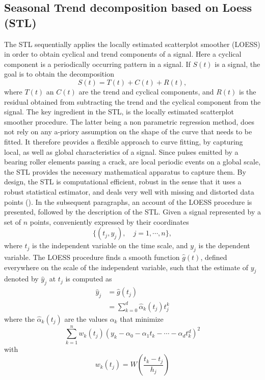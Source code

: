 \documentclass[../Main/thesis.tex]{subfiles}
\begin{document}
\subsection{Seasonal Trend decomposition based on Loess (STL)}
The STL sequentially applies the locally estimated scatterplot smoother (LOESS) in order to obtain cyclical and trend components of a signal. Here a cyclical component is a periodically occurring pattern in a signal.
If $S(t)$ is a signal, the goal is to obtain the decomposition 
\begin{equation}
S(t) = T(t) + C(t) + R(t),
\end{equation} 
where $T(t)$ an $C(t)$ are the trend and cyclical components, and $R(t)$ is the residual obtained from subtracting  the trend and the cyclical component from the signal. The key ingredient in the STL, is the locally estimated scatterplot smoother procedure. The latter being a non parametric regression method, does not rely on any a-priory assumption on the shape of the curve that needs to be fitted. It therefore provides a flexible approach to curve fitting, by capturing local, as well as global characteristics of a signal. Since pulses emitted by a bearing roller elements passing a crack, are local periodic events on a global scale, the STL provides the necessary mathematical apparatus to capture them.
\justify
By design, the STL is computational efficient, robust in the sense that it uses a robust statistical estimator, and deals very well with missing and distorted data points (\cite{Cleveland-et-al-1990}). In the subsequent paragraphs, an account of the LOESS procedure is presented, followed by the description of the STL.
\justify
Given a signal represented by a set of $n$ points, conveniently expressed by their coordinates
\begin{equation}
\{ (t_{j}, y_{j}), \quad j = 1, \cdots, n\},
\end{equation}
where $t_{j}$ is the independent variable on the time scale, and $y_{j}$ is the dependent variable. The LOESS procedure finds a smooth function $\hat{g}(t)$, defined everywhere on the scale of the independent variable, such that the estimate of $y_{j}$ denoted by $\hat{y}_{j}$ at $t_{j}$ is computed as 
\begin{equation}
\begin{split}
\hat{y}_{j} &= \hat{g}(t_{j}) \\
                &=\sum_{k=0}^{d}\hat{\alpha}_{k}(t_{j})t_{j}^{k}
\end{split}
\end{equation}
where the $\hat{\alpha}_{k}(t_{j})$ are the values $\alpha_{k}$ that minimize 
\begin{equation}
\sum_{k=1}^{n}w_{k}(t_{j})\left(y_{k}-\alpha_{0}-\alpha_{1}t_{k}-\cdots -\alpha_{d}t_{k}^{d}\right)^{2}
\end{equation}
with 
\begin{equation}
w_{k}(t_{j}) = W\left( \frac{t_{k}-t_{j}}{h_{j}} \right)
\end{equation}
\end{document}
